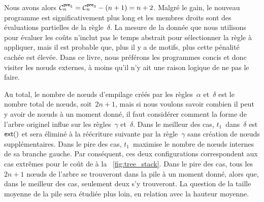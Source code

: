 Nous avons alors \(\C{\fun{pre}_5}{n} = \C{\fun{pre}_3}{n} - (n+1) = n
+
2\).
Malgré le gain, le nouveau programme est significativement plus long
et les membres droits sont des évaluations partielles de la règle~\(\delta\). La
mesure de la donnée que nous utilisons pour évaluer les coûts n'inclut
pas le temps abstrait pour sélectionner la règle à appliquer, mais il
est probable que, plus il y a de motifs, plus cette pénalité cachée
est élevée. Dans ce livre, nous préférons les programmes concis et
donc visiter les n{\oe}uds externes, à moins qu'il n'y ait une raison
logique de ne pas le faire.

Au total, le nombre de n{\oe}uds d'empilage
créés par les règles~\(\alpha\) et~\(\delta\) est le nombre total de
n{\oe}uds, soit~\(2n+1\), mais si nous voulons savoir combien il peut
y avoir de n{\oe}uds à un moment donné, il faut considérer comment la
forme de l'arbre originel influe sur les règles~\(\gamma\)
et~\(\delta\). Dans le meilleur des cas, \(t_1\)~dans~\(\delta\) est
\(\fun{ext}()\) et sera éliminé à la réécriture suivante par la
règle~\(\gamma\) sans création de n{\oe}uds supplémentaires. Dans le
pire des cas, \(t_1\)~maximise le nombre de n{\oe}uds internes de sa
branche gauche. Par conséquent, ces deux configurations correspondent
aux cas extrêmes pour le coût de
 à la
\fig~\vref{fig:tree_stack}. Dans le pire des cas, tous les \(2n+1\)
n{\oe}uds de l'arbre se trouveront dans la pile à un moment donné,
alors que, dans le meilleur des cas, seulement deux s'y trouveront. La
question de la taille moyenne de la pile sera étudiée plus loin, en
relation avec la hauteur moyenne.

